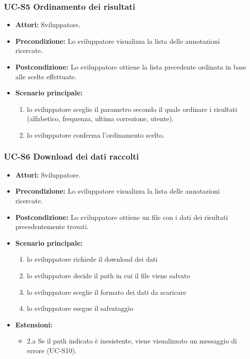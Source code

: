 	\subsubsection{UC-S5 Ordinamento dei risultati}
		\begin{itemize}
			\item \textbf{Attori:} Sviluppatore.
			\item \textbf{Precondizione:} Lo sviluppatore visualizza la lista delle annotazioni ricercate.
			\item \textbf{Postcondizione:} Lo sviluppatore ottiene la lista precedente ordinata in base alle scelte effettuate.
			\item \textbf{Scenario principale:}
				\begin{enumerate}
					\item lo sviluppatore sceglie il parametro secondo il quale ordinare i risultati (alfabetico, frequenza, ultima correzione, utente).
					\item lo sviluppatore conferma l'ordinamento scelto.
				\end{enumerate}
		\end{itemize} 
	
	\subsubsection{UC-S6 Download dei dati raccolti}
		\begin{itemize}
			\item \textbf{Attori:} Sviluppatore.
			\item \textbf{Precondizione:} Lo sviluppatore visualizza la lista delle annotazioni ricercate.
			\item \textbf{Postcondizione:} Lo sviluppatore ottiene un file con i dati dei risultati precedentemente trovati.
			\item \textbf{Scenario principale:}
				\begin{enumerate}
					\item lo sviluppatore richiede il download dei dati
					\item lo sviluppatore decide il path in cui il file viene salvato
					\item lo sviluppatore sceglie il formato dei dati da scaricare
					\item lo sviluppatore esegue il salvataggio
				\end{enumerate}
			\item \textbf{Estensioni:}
				\begin{itemize}
					\item 2.a Se il path indicato è inesistente, viene visualizzato un messaggio di errore (UC-S10).
				\end{itemize}
		\end{itemize}	
	
